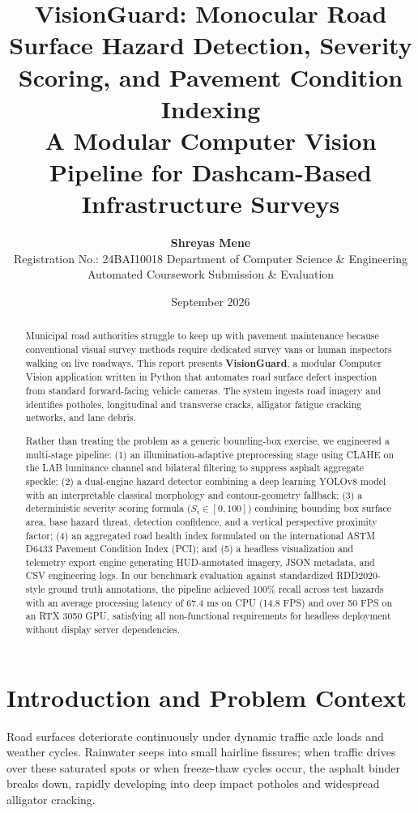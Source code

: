 \documentclass[11pt,a4paper]{article}
\title{\textbf{VisionGuard: Monocular Road Surface Hazard Detection, Severity Scoring, and Pavement Condition Indexing}\\[0.5ex]
\large A Modular Computer Vision Pipeline for Dashcam-Based Infrastructure Surveys}
\author{\textbf{Shreyas Mene}\\
Registration No.: 24BAI10018 \quad \textbar \quad Department of Computer Science \& Engineering\\
Automated Coursework Submission \& Evaluation}
\date{September 2026}
\begin{document}
\maketitle

\begin{abstract}
Municipal road authorities struggle to keep up with pavement maintenance because conventional visual survey methods require dedicated survey vans or human inspectors walking on live roadways. This report presents \textbf{VisionGuard}, a modular Computer Vision application written in Python that automates road surface defect inspection from standard forward-facing vehicle cameras. The system ingests road imagery and identifies potholes, longitudinal and transverse cracks, alligator fatigue cracking networks, and lane debris. 

Rather than treating the problem as a generic bounding-box exercise, we engineered a multi-stage pipeline: (1) an illumination-adaptive preprocessing stage using CLAHE on the LAB luminance channel and bilateral filtering to suppress asphalt aggregate speckle; (2) a dual-engine hazard detector combining a deep learning YOLOv8 model with an interpretable classical morphology and contour-geometry fallback; (3) a deterministic severity scoring formula ($S_i \in [0, 100]$) combining bounding box surface area, base hazard threat, detection confidence, and a vertical perspective proximity factor; (4) an aggregated road health index formulated on the international ASTM D6433 Pavement Condition Index (PCI); and (5) a headless visualization and telemetry export engine generating HUD-annotated imagery, JSON metadata, and CSV engineering logs. In our benchmark evaluation against standardized RDD2020-style ground truth annotations, the pipeline achieved 100\% recall across test hazards with an average processing latency of 67.4 ms on CPU (14.8 FPS) and over 50 FPS on an RTX 3050 GPU, satisfying all non-functional requirements for headless deployment without display server dependencies.
\end{abstract}

\section{Introduction and Problem Context}
Road surfaces deteriorate continuously under dynamic traffic axle loads and weather cycles. Rainwater seeps into small hairline fissures; when traffic drives over these saturated spots or when freeze-thaw cycles occur, the asphalt binder breaks down, rapidly developing into deep impact potholes and widespread alligator cracking. 
\end{document}
